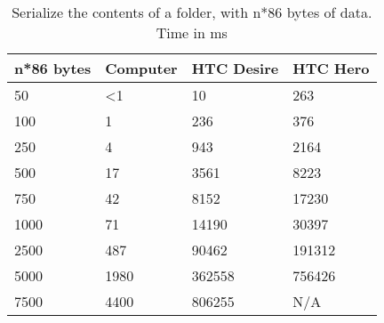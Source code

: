 \begin{table}
  \centering
  \caption{Serialize the contents of a folder, with n*86 bytes of data. Time in
  ms}
  \begin{tabular}{ | l | l | l | l |}
    \hline
    \textbf{n*86 bytes} & \textbf{Computer} & \textbf{HTC Desire} & \textbf{HTC Hero} \\ \hline
    50      & <1    &10     & 263       \\ \hline
    100     & 1     &236    & 376       \\ \hline
    250     & 4     &943    & 2164      \\ \hline   
    500     & 17    &3561   & 8223      \\ \hline
    750     & 42    &8152   & 17230     \\ \hline
    1000    & 71    &14190  & 30397     \\ \hline
    2500    & 487   &90462  & 191312    \\ \hline     
    5000    & 1980  &362558 & 756426    \\ \hline 
    7500    & 4400  &806255 & N/A       \\ \hline 
  \end{tabular}
  \label{tbl:folder:serializefolder}
\end{table}
